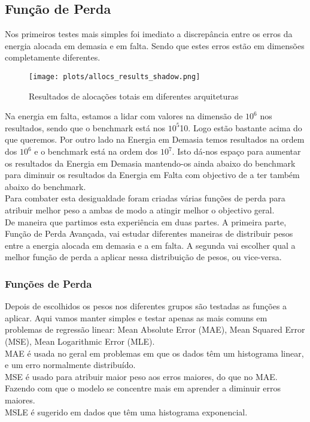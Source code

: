 \subsection{Função de Perda}

Nos primeiros testes mais simples foi imediato a discrepância entre os erros da energia alocada em demasia e em falta. Sendo que estes erros estão em dimensões completamente diferentes.
\begin{figure}[H]
    \centering
    \texttt{[image: plots/allocs\_results\_shadow.png]}
    \caption{Resultados de alocações totais em diferentes arquiteturas}
    \label{fig:resexparchs}
  \end{figure}

Na energia em falta, estamos a lidar com valores na dimensão de $10^{6}$ nos resultados, sendo que o benchmark está nos $10^{5}$10. Logo estão bastante acima do que queremos. Por outro lado na Energia em Demasia temos resultados na ordem dos $10^{6}$ e o benchmark está na ordem dos $10^{7}$. Isto dá-nos espaço para aumentar os resultados da Energia em Demasia mantendo-os ainda abaixo do benchmark para diminuir os resultados da Energia em Falta com objectivo de a ter também abaixo do benchmark.\\
Para combater esta desigualdade foram criadas várias funções de perda para atribuir melhor peso a ambas de modo a atingir melhor o objectivo geral.\\
De maneira que partimos esta experiência em duas partes. A primeira parte, Função de Perda Avançada, vai estudar diferentes maneiras de distribuir pesos entre a energia alocada em demasia e a em falta. A segunda vai escolher qual a melhor função de perda a aplicar nessa distribuição de pesos, ou vice-versa.\\


\subsubsection{Funções de Perda}
Depois de escolhidos os pesos nos diferentes grupos são testadas as funções a aplicar. Aqui vamos manter simples e testar apenas as mais comuns em problemas de regressão linear: Mean Absolute Error (MAE), Mean Squared Error (MSE), Mean Logarithmic Error (MLE).\\
MAE é usada no geral em problemas em que os dados têm um histograma linear, e um erro normalmente distribuído.\\
MSE é usado para atribuir maior peso aos erros maiores, do que no MAE. Fazendo com que o modelo se concentre mais em aprender a diminuir erros maiores.\\
MSLE é sugerido em dados que têm uma histograma exponencial.\\

